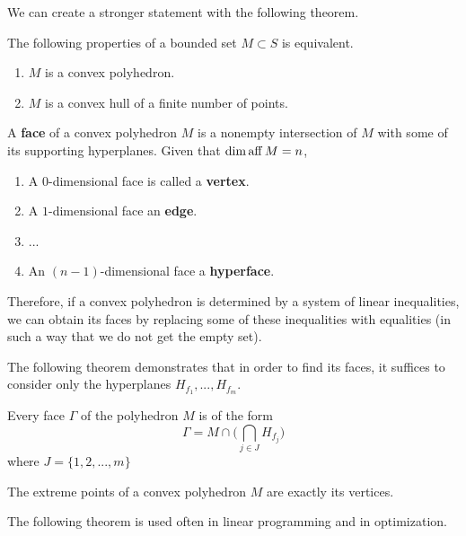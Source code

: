   We can create a stronger statement with the following theorem. 

  \begin{theorem}
    The following properties of a bounded set $M \subset S$ is equivalent.
    \begin{enumerate}
      \item $M$ is a convex polyhedron. 
      \item $M$ is a convex hull of a finite number of points. 
    \end{enumerate}
  \end{theorem}

  \begin{definition}
    A \textbf{face} of a convex polyhedron $M$ is a nonempty intersection of $M$ with some of its supporting hyperplanes. Given that $\dim \operatorname{aff} M = n$, 
    \begin{enumerate}
      \item A $0$-dimensional face is called a \textbf{vertex}. 
      \item A $1$-dimensional face an \textbf{edge}. 
      \item ...
      \item An $(n-1)$-dimensional face a \textbf{hyperface}. 
    \end{enumerate}
  \end{definition}

  Therefore, if a convex polyhedron is determined by a system of linear inequalities, we can obtain its faces by replacing some of these inequalities with equalities (in such a way that we do not get the empty set). 

  The following theorem demonstrates that in order to find its faces, it suffices to consider only the hyperplanes $H_{f_1}, ..., H_{f_m}$. 

  \begin{theorem}
    Every face $\Gamma$ of the polyhedron $M$ is of the form
    \begin{equation}
      \Gamma = M \cap \bigg( \bigcap_{j \in J} H_{f_j} \bigg)
    \end{equation}
    where $J = \{1, 2, ..., m\}$
  \end{theorem}

  \begin{proposition}
    The extreme points of a convex polyhedron $M$ are exactly its vertices. 
  \end{proposition}

  The following theorem is used often in linear programming and in optimization. 

